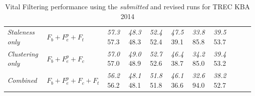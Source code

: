 \documentclass{article}
\newcommand{\sub}[1]{\textit{#1}}
\begin{document}
\begin{table}[tb]
{\begin{center}
\begin{tabular}{llccccccccc}
{\textit{Staleness only}} & $F_b+F_e^p+F_t$ & 
  \sub{57.3} \hspace{1mm} 57.3 & \sub{48.3} \hspace{1mm} 48.3 & \sub{52.4} \hspace{1mm} 52.4 &
  \sub{47.5} \hspace{1mm} 39.1 & \sub{33.8} \hspace{1mm} 85.8 & \sub{39.5} \hspace{1mm} 53.7 \\
{\textit{Clustering only}} & $F_b+F_e^p+F_c$ & 
  \sub{57.0} \hspace{1mm} 57.0 & \sub{49.0} \hspace{1mm} 48.9 & \sub{52.7} \hspace{1mm} 52.6 &
  \sub{46.4} \hspace{1mm} 38.7 & \sub{34.2} \hspace{1mm} 85.0 & \sub{39.4} \hspace{1mm} 53.2 \\
{\textit{Combined}} & $F_b+F_e^p+F_c+F_t$ &
  \sub{56.2} \hspace{1mm} 56.2 & \sub{48.1} \hspace{1mm} 48.1 & \sub{51.8} \hspace{1mm} 51.8 &
  \sub{46.1} \hspace{1mm} 36.6 & \sub{32.6} \hspace{1mm} 94.0 & \sub{38.2} \hspace{1mm} 52.7 \\
 
\bottomrule
\end{tabular}
\end{center}
}
\caption{Vital Filtering performance using the \sub{submitted} and revised runs for TREC KBA 2014}
\label{officialRes}
\end{table}
\end{document}
